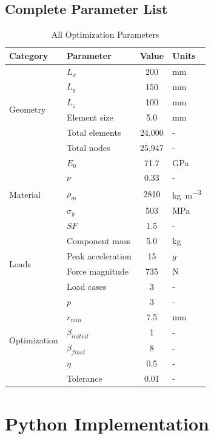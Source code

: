 \documentclass[11pt]{report}
\newcommand{\youngs}{E}
\newcommand{\youngszero}{\youngs_0}
\newcommand{\penalty}{p}
\newcommand{\yieldstress}{\sigma_y}
\begin{document}
\section{Complete Parameter List}
\begin{table}[h]
\centering
\caption{All Optimization Parameters}
\begin{tabular}{@{}llcl@{}}
\toprule
Category & Parameter & Value & Units \\ 
\midrule
\multirow{6}{*}{Geometry} & $L_x$ & 200 & \si{\milli\meter} \\
& $L_y$ & 150 & \si{\milli\meter} \\
& $L_z$ & 100 & \si{\milli\meter} \\
& Element size & 5.0 & \si{\milli\meter} \\
& Total elements & 24,000 & - \\
& Total nodes & 25,947 & - \\
\midrule
\multirow{5}{*}{Material} & $\youngszero$ & 71.7 & \si{\giga\pascal} \\
& $\nu$ & 0.33 & - \\
& $\rho_m$ & 2810 & \si{\kilogram\per\cubic\meter} \\
& $\yieldstress$ & 503 & \si{\mega\pascal} \\
& $SF$ & 1.5 & - \\
\midrule
\multirow{4}{*}{Loads} & Component mass & 5.0 & \si{\kilogram} \\
& Peak acceleration & 15 & $g$ \\
& Force magnitude & 735 & \si{\newton} \\
& Load cases & 3 & - \\
\midrule
\multirow{6}{*}{Optimization} & $\penalty$ & 3 & - \\
& $r_{min}$ & 7.5 & \si{\milli\meter} \\
& $\beta_{initial}$ & 1 & - \\
& $\beta_{final}$ & 8 & - \\
& $\eta$ & 0.5 & - \\
& Tolerance & 0.01 & - \\
\bottomrule
\end{tabular}
\end{table}

\chapter{Python Implementation}
\end{document}

